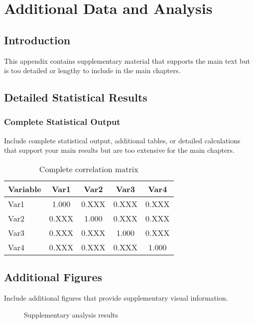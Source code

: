 \chapter{Additional Data and Analysis}

\section{Introduction}

This appendix contains supplementary material that supports the main text but is too detailed or lengthy to include in the main chapters.

\section{Detailed Statistical Results}

\subsection{Complete Statistical Output}

Include complete statistical output, additional tables, or detailed calculations that support your main results but are too extensive for the main chapters.

\begin{table}[h]
\centering
\caption{Complete correlation matrix}
\label{tab:correlation_matrix}
\begin{tabular}{|l|c|c|c|c|}
\hline
\textbf{Variable} & \textbf{Var1} & \textbf{Var2} & \textbf{Var3} & \textbf{Var4} \\
\hline
Var1 & 1.000 & 0.XXX & 0.XXX & 0.XXX \\
Var2 & 0.XXX & 1.000 & 0.XXX & 0.XXX \\
Var3 & 0.XXX & 0.XXX & 1.000 & 0.XXX \\
Var4 & 0.XXX & 0.XXX & 0.XXX & 1.000 \\
\hline
\end{tabular}
\end{table}

\section{Additional Figures}

Include additional figures that provide supplementary visual information.

\begin{figure}[h]
\centering
\caption{Supplementary analysis results}
\label{fig:supplementary}
\end{figure}

